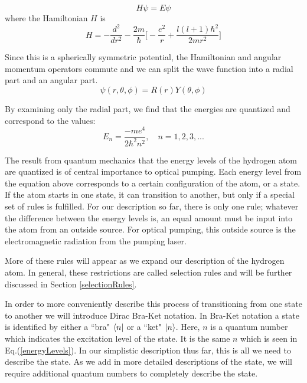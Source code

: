 \documentclass[letter,12pt]{article}
\begin{document}
		\begin{equation}
		  H\psi = E\psi
		\end{equation}
		where the Hamiltonian $H$ is 
		\begin{equation}
			H=-\frac{d^2}{dr^2}-\frac{2m}{\hbar}\Big[-\frac{e^2}{r} + \frac{l(l+1)\hbar^2}{2mr^2}\Big]
		\end{equation}
		
		Since this is a spherically
		symmetric potential, the Hamiltonian and angular momentum
		operators commute and we can split the wave function into a
		radial part and an angular part. 
		\begin{equation}
			\psi(r,\theta,\phi)=R(r)Y(\theta,\phi)
		\end{equation}

		By examining only the radial part, we find that the energies
		are quantized and correspond to the values:
		\begin{equation}\label{energyLevels}
			E_n=\frac{-me^4}{2\hbar^2n^2},\quad n=1,2,3,...
		\end{equation}

		The result from quantum mechanics that the energy levels 
		of the hydrogen atom are 
		quantized is of central importance to optical pumping. 
		Each energy level from the equation above 
		corresponds to a certain configuration of the 
		atom, or a state. If the atom starts in one state, it can 
		transition to another, but
		only if a special set of rules is fulfilled. 
        For our description so far, there is only one rule;
		whatever the difference between the energy levels is, 
		an equal amount must be input into the atom from an outside
		source. For optical pumping, this outside source
		is the electromagnetic radiation from the pumping laser.
	
        More of these rules will appear as we
        expand our description of the hydrogen atom.
        In general, these restrictions 
        are called selection rules and will be further
        discussed in 
        Section \ref{selectionRules}.

        In order to more conveniently describe 
        this process of transitioning from one state to another
        we will introduce Dirac Bra-Ket notation. In 
        Bra-Ket notation a state is identified by 
        either a ``bra" $\bra{n}$
        or a ``ket" $\ket{n}$. Here, $n$ is a quantum number
		which indicates the excitation level of the state.
		It is the same $n$ which is seen in Eq.(\ref{energyLevels}). 
		In our simplistic description thus far, 
		this is all we need to describe the state.
		As we add in more detailed descriptions of 
		the state, we will require additional quantum
		numbers to completely 
		describe the state.
\end{document}
